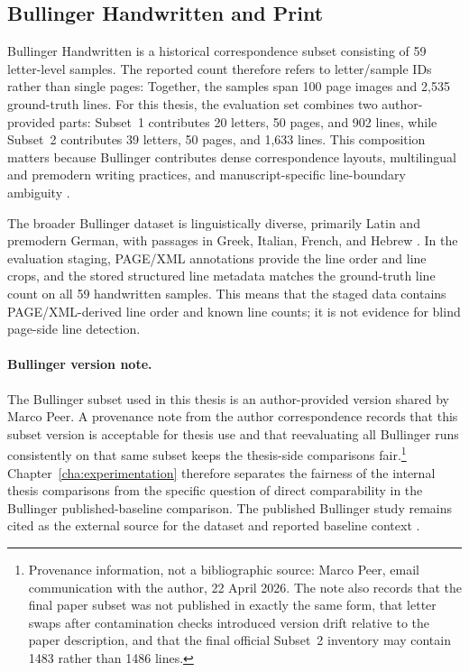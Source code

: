 \subsection{Bullinger Handwritten and Print}
\label{sec:data_bullinger}

Bullinger Handwritten is a historical correspondence subset consisting of 59 letter-level samples. The reported count therefore refers to letter/sample IDs rather than single pages: Together, the samples span 100 page images and 2{,}535 ground-truth lines. For this thesis, the evaluation set combines two author-provided parts: Subset~1 contributes 20 letters, 50 pages, and 902 lines, while Subset~2 contributes 39 letters, 50 pages, and 1{,}633 lines. This composition matters because Bullinger contributes dense correspondence layouts, multilingual and premodern writing practices, and manuscript-specific line-boundary ambiguity .

The broader Bullinger dataset is linguistically diverse, primarily Latin and premodern German, with passages in Greek, Italian, French, and Hebrew . In the evaluation staging, PAGE/XML annotations provide the line order and line crops, and the stored structured line metadata matches the ground-truth line count on all 59 handwritten samples. This means that the staged data contains PAGE/XML-derived line order and known line counts; it is not evidence for blind page-side line detection.

\paragraph{Bullinger version note.}
The Bullinger subset used in this thesis is an author-provided version shared by Marco Peer. A provenance note from the author correspondence records that this subset version is acceptable for thesis use and that reevaluating all Bullinger runs consistently on that same subset keeps the thesis-side comparisons fair.\footnote{Provenance information, not a bibliographic source: Marco Peer, email communication with the author, 22 April 2026. The note also records that the final paper subset was not published in exactly the same form, that letter swaps after contamination checks introduced version drift relative to the paper description, and that the final official Subset~2 inventory may contain 1483 rather than 1486 lines.} Chapter~\ref{cha:experimentation} therefore separates the fairness of the internal thesis comparisons from the specific question of direct comparability in the Bullinger published-baseline comparison. The published Bullinger study remains cited as the external source for the dataset and reported baseline context .

